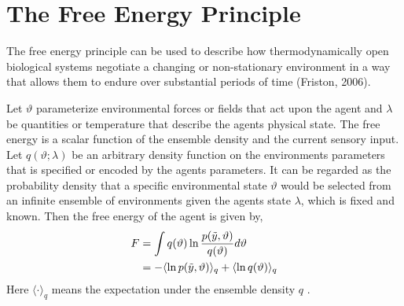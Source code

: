\documentclass{article}
\begin{document}
\section{The Free Energy Principle}

The free energy principle can be used to describe how thermodynamically open biological systems negotiate a changing or non-stationary environment in a way that allows them to endure over substantial periods of time (Friston, 2006).

Let $\vartheta$ parameterize environmental forces or fields that act upon the agent and $\lambda$ be quantities or temperature that describe the agents physical state. The free energy is a scalar function of the ensemble density and the current sensory input. Let $q(\vartheta ;\lambda)$ be an arbitrary density function on the environments parameters that is specified or encoded by the agents parameters. It can be regarded as the probability density that a specific environmental state $\vartheta$ would be selected from an infinite ensemble of environments given the agents state $\lambda$, which is fixed and known. Then the free energy of the agent is given by, 
\begin{align}\label{eq:free-energy-1}
\begin{split} 
    F &= \int q(\vartheta) \ln \frac{p(\Tilde{y},\vartheta)}{q(\vartheta)} d\vartheta \\
    &= - \langle \ln p(\Tilde{y},\vartheta) \rangle_q + \langle \ln q(\vartheta) \rangle_q
\end{split}
\end{align}
Here $\langle \cdot \rangle_q$ means the expectation under the ensemble density $q$ .



\end{document}
